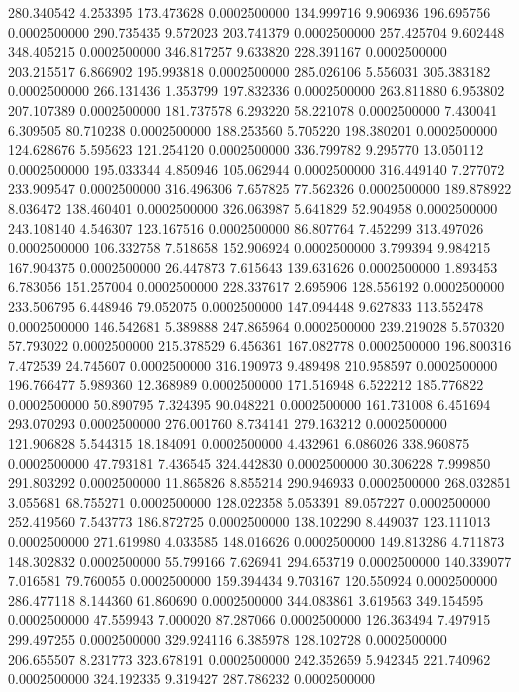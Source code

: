 280.340542 4.253395 173.473628 0.0002500000
134.999716 9.906936 196.695756 0.0002500000
290.735435 9.572023 203.741379 0.0002500000
257.425704 9.602448 348.405215 0.0002500000
346.817257 9.633820 228.391167 0.0002500000
203.215517 6.866902 195.993818 0.0002500000
285.026106 5.556031 305.383182 0.0002500000
266.131436 1.353799 197.832336 0.0002500000
263.811880 6.953802 207.107389 0.0002500000
181.737578 6.293220 58.221078 0.0002500000
7.430041 6.309505 80.710238 0.0002500000
188.253560 5.705220 198.380201 0.0002500000
124.628676 5.595623 121.254120 0.0002500000
336.799782 9.295770 13.050112 0.0002500000
195.033344 4.850946 105.062944 0.0002500000
316.449140 7.277072 233.909547 0.0002500000
316.496306 7.657825 77.562326 0.0002500000
189.878922 8.036472 138.460401 0.0002500000
326.063987 5.641829 52.904958 0.0002500000
243.108140 4.546307 123.167516 0.0002500000
86.807764 7.452299 313.497026 0.0002500000
106.332758 7.518658 152.906924 0.0002500000
3.799394 9.984215 167.904375 0.0002500000
26.447873 7.615643 139.631626 0.0002500000
1.893453 6.783056 151.257004 0.0002500000
228.337617 2.695906 128.556192 0.0002500000
233.506795 6.448946 79.052075 0.0002500000
147.094448 9.627833 113.552478 0.0002500000
146.542681 5.389888 247.865964 0.0002500000
239.219028 5.570320 57.793022 0.0002500000
215.378529 6.456361 167.082778 0.0002500000
196.800316 7.472539 24.745607 0.0002500000
316.190973 9.489498 210.958597 0.0002500000
196.766477 5.989360 12.368989 0.0002500000
171.516948 6.522212 185.776822 0.0002500000
50.890795 7.324395 90.048221 0.0002500000
161.731008 6.451694 293.070293 0.0002500000
276.001760 8.734141 279.163212 0.0002500000
121.906828 5.544315 18.184091 0.0002500000
4.432961 6.086026 338.960875 0.0002500000
47.793181 7.436545 324.442830 0.0002500000
30.306228 7.999850 291.803292 0.0002500000
11.865826 8.855214 290.946933 0.0002500000
268.032851 3.055681 68.755271 0.0002500000
128.022358 5.053391 89.057227 0.0002500000
252.419560 7.543773 186.872725 0.0002500000
138.102290 8.449037 123.111013 0.0002500000
271.619980 4.033585 148.016626 0.0002500000
149.813286 4.711873 148.302832 0.0002500000
55.799166 7.626941 294.653719 0.0002500000
140.339077 7.016581 79.760055 0.0002500000
159.394434 9.703167 120.550924 0.0002500000
286.477118 8.144360 61.860690 0.0002500000
344.083861 3.619563 349.154595 0.0002500000
47.559943 7.000020 87.287066 0.0002500000
126.363494 7.497915 299.497255 0.0002500000
329.924116 6.385978 128.102728 0.0002500000
206.655507 8.231773 323.678191 0.0002500000
242.352659 5.942345 221.740962 0.0002500000
324.192335 9.319427 287.786232 0.0002500000

